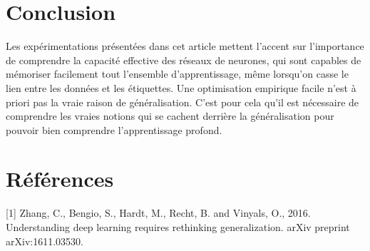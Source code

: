 \documentclass[a4paper,english,12pt, twocolumn]{article}
\makeatletter
\newcommand{\emptypage}[1]{
  \cleardoublepage
  \begingroup
  \let\ps@plain\ps@empty
  \pagestyle{empty}
  #1
  \cleardoublepage
  \endgroup}
\makeatother
\begin{document}
\section{Conclusion} 
\vspace{-1em}
Les expérimentations présentées dans cet article mettent l’accent sur l’importance de comprendre la capacité effective des réseaux de neurones, qui sont capables de mémoriser facilement tout l’ensemble d’apprentissage, même lorsqu'on casse le lien entre les données et les étiquettes. Une optimisation empirique facile n'est à priori pas la vraie raison de généralisation. C’est pour cela qu’il est nécessaire de comprendre les vraies notions qui se cachent derrière la généralisation pour pouvoir bien comprendre l’apprentissage profond.
\vspace{-1em}
\section*{Références}
\vspace{-1em}
[1] Zhang, C., Bengio, S., Hardt, M., Recht, B. and Vinyals, O., 2016. Understanding deep learning requires rethinking generalization. arXiv preprint arXiv:1611.03530.

%
%
\end{document}
